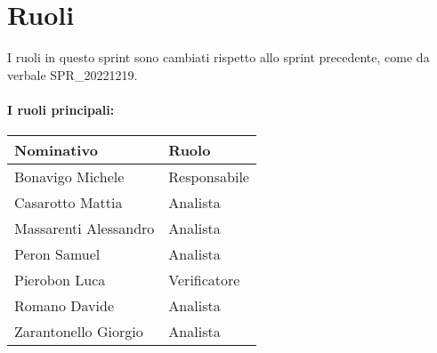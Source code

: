 \section{Ruoli}

I ruoli in questo sprint sono cambiati rispetto allo sprint precedente, come da verbale SPR\_20221219.

\paragraph{I ruoli principali:}

\begin{center}
    \begin{tabularx}{\textwidth}{X l}
        
        \rowcolor{gray!30} \textbf{Nominativo} & \textbf{Ruolo}\\
        
        \hline

        Bonavigo Michele & Responsabile \\
        \rowcolor{gray!10}Casarotto Mattia & Analista \\
        Massarenti Alessandro & Analista \\
        \rowcolor{gray!10}Peron Samuel & Analista \\
        Pierobon Luca & Verificatore \\
        \rowcolor{gray!10}Romano Davide & Analista \\
        Zarantonello Giorgio & Analista \\

    \end{tabularx}
\end{center}
